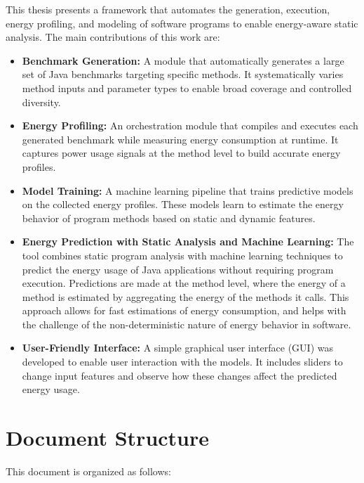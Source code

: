 This thesis presents a framework that automates the generation, execution, energy profiling, and modeling of software programs to enable energy-aware static analysis. The main contributions of this work are:

\begin{itemize}
    \item \textbf{Benchmark Generation:} A module that automatically generates a large set of Java benchmarks targeting specific methods. It systematically varies method inputs and parameter types to enable broad coverage and controlled diversity.

    \item \textbf{Energy Profiling:} An orchestration module that compiles and executes each generated benchmark while measuring energy consumption at runtime. It captures power usage signals at the method level to build accurate energy profiles.

    \item \textbf{Model Training:} A machine learning pipeline that trains predictive models on the collected energy profiles. These models learn to estimate the energy behavior of program methods based on static and dynamic features.
    
    \item \textbf{Energy Prediction with Static Analysis and Machine Learning:} The tool combines static program analysis with machine learning techniques to predict the energy usage of Java applications without requiring program execution. Predictions are made at the method level, where the energy of a method is estimated by aggregating the energy of the methods it calls. This approach allows for fast estimations of energy consumption, and helps with the challenge of the non-deterministic nature of energy behavior in software.

    \item \textbf{User-Friendly Interface:} A simple graphical user interface (GUI) was developed to enable user interaction with the models. It includes sliders to change input features and observe how these changes affect the predicted energy usage.
\end{itemize}



\section{Document Structure}

This document is organized as follows:

